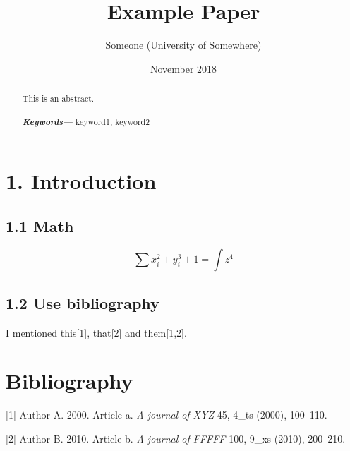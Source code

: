 \documentclass[a4paperpaper,]{article}
\title{Example Paper}
\author{Someone (University of Somewhere)}
\date{November 2018}
\begin{document}
\maketitle

\providecommand{\keywords}[1]
{
  \small
  \textbf{\textit{Keywords---}} #1
}

\hspace{5pt}
\begin{abstract}
This is an abstract.
\\ \\
\keywords{keyword1, keyword2}
\end{abstract} \hspace{5pt}

\hypertarget{introduction}{%
\section{1. Introduction}\label{introduction}}

\hypertarget{math}{%
\subsection{1.1 Math}\label{math}}

\[
    \sum{x_i^2 + y_i^3 + 1} = \int{z^4}
\]

\hypertarget{use-bibliography}{%
\subsection{1.2 Use bibliography}\label{use-bibliography}}

I mentioned this{[}1{]}, that{[}2{]} and them{[}1,2{]}.

\hypertarget{bibliography}{%
\section*{Bibliography}\label{bibliography}}

\hypertarget{refs}{}
\leavevmode\hypertarget{ref-bib1}{}%
{[}1{]} Author A. 2000. Article a. \emph{A journal of XYZ} 45, 4\_ts
(2000), 100--110.

\leavevmode\hypertarget{ref-bib2}{}%
{[}2{]} Author B. 2010. Article b. \emph{A journal of FFFFF} 100, 9\_xs
(2010), 200--210.
\end{document}
